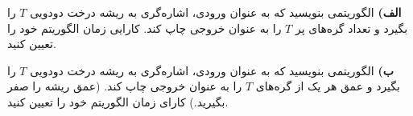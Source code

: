 \documentclass[]{article}
\begin{document}
\textbf{الف)}
الگوریتمی بنویسید که به عنوان ورودی، اشاره‌گری به ریشه درخت دودویی
$T$
را بگیرد و تعداد گره‌های پر
$T$
را به عنوان خروجی چاپ کند. کارایی زمان الگوریتم خود را تعیین کنید.

\textbf{ب)}
الگوریتمی بنویسید که به عنوان ورودی، اشاره‌گری به ریشه درخت دودویی
$T$
را بگیرد و عمق هر یک از گره‌های
$T$
را به عنوان خروجی چاپ کند.
(عمق ریشه را صفر بگیرید.)
کارای زمان الگوریتم خود را تعیین کنید.
\end{document}
